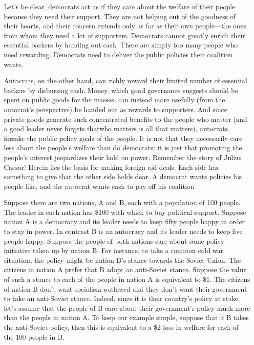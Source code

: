 \documentclass[10pt]{article}
\begin{document}
{\large Let's be clear, democrats act as if they care about the welfare of their
people because they need their support. They are not helping out of the goodness
of their hearts, and their concern extends only as far as their own people---the
ones from whom they need a lot of supporters. Democrats cannot greatly enrich
their essential backers by handing out cash. There are simply too many people who
need rewarding. Democrats need to deliver the public policies their coalition
wants.}

{\large Autocrats, on the other hand, can richly reward their limited number of
essential backers by disbursing cash. Money, which good governance suggests
should be spent on public goods for the masses, can instead more usefully (from
the autocrat's perspective) be handed out as rewards to supporters. And since
private goods generate such concentrated benefits to the people who matter (and a
good leader never forgets thatwho matters is all that matters), autocrats forsake
the public policy goals of the people. It is not that they necessarily care less
about the people's welfare than do democrats; it is just that promoting the
people's interest jeopardizes their hold on power. Remember the story of Julius
Caesar! Herein lies the basis for making foreign aid deals. Each side has
something to give that the other side holds dear. A democrat wants policies his
people like, and the autocrat wants cash to pay off his coalition.}

{\large Suppose there are two nations, A and B, each with a population of 100
people. The leader in each nation has \$100 with which to buy political support.
Suppose nation A is a democracy and its leader needs to keep fifty people happy
in order to stay in power. In contrast B is an autocracy and its leader needs to
keep five people happy. Suppose the people of both nations care about some policy
initiative taken up by nation B. For instance, to take a common cold war
situation, the policy might be nation B's stance towards the Soviet Union. The
citizens in nation A prefer that B adopt an anti-Soviet stance. Suppose the value
of such a stance to each of the people in nation A is equivalent to \$1. The
citizens of nation B don't want socialism outlawed and they don't want their
government to take an anti-Soviet stance. Indeed, since it is their country's
policy at stake, let's assume that the people of B care about their government's
policy much more than the people in nation A. To keep our example simple, suppose
that if B takes the anti-Soviet policy, then this is equivalent to a \$2 loss in
welfare for each of the 100 people in B.}
\end{document}
